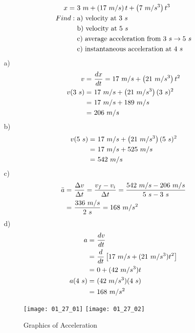 	\begin{align}
		x = \ &3 \ m + \left( 17 \ m/s \right)t + \left(7 \ m/s^{3} \right)t^{3}& \notag \\
		Find: \ &\text{a) velocity at }3 \ s& \notag \\
		&\text{b) velocity at }5 \ s& \notag \\
		&\text{c) average acceleration from }3 \ s \to 5 \ s& \notag \\
		&\text{c) instantaneous acceleration at }4 \ s& \notag
	\end{align}
	a)
	\begin{align}
		v = \ &\frac{dx}{dt} = 17 \ m/s + \left( 21 \ m/s^{3} \right)t^{2}& \notag \\
		v(3 \ s) = \ &17 \ m/s + \left( 21 \ m/s^{3} \right)(3 \ s)^{2}& \notag \\
		= \ &17 \ m/s + 189 \ m/s& \notag \\
		= \ &206 \ m/s& \notag
	\end{align}
	b)
	\begin{align}
		v(5 \ s) = \ &17 \ m/s + \left( 21 \ m/s^{3} \right)(5 \ s)^{2}& \notag \\
		= \ &17 \ m/s + 525 \ m/s& \notag \\
		= \ &542 \ m/s& \notag
	\end{align}
	c)
	\begin{align}
		\bar{a} = \ &\frac{\Delta v}{\Delta t} = \frac{v_{f} - v_{i}}{\Delta t} = \frac{542 \ m/s - 206 \ m/s}{5 \ s - 3 \ s}& \notag \\
		= \ &\frac{336 \ m/s}{2 \ s} = 168 \ m/s^{2}& \notag
	\end{align}
	d)
	\begin{align}
		a = \ &\frac{dv}{dt}& \notag \\
		= \ &\frac{d}{dt}\left[ 17 \ m/s + (21 \ m/s^{3})t^{2} \right]& \notag \\
		= \ &0 + (42 \ m/s^{3})t& \notag \\
		a(4 \ s) = \ &(42 \ m/s^{3})(4 \ s)& \notag \\
		= \ &168 \ m/s^{2}& \notag
	\end{align}
	\begin{figure}[H]
		\begin{center}
			\texttt{[image: 01\_27\_01]}
			\texttt{[image: 01\_27\_02]}
			\caption{Graphics of Acceleration}
			\label{fig:01_27_01-02}
		\end{center}
	\end{figure}

